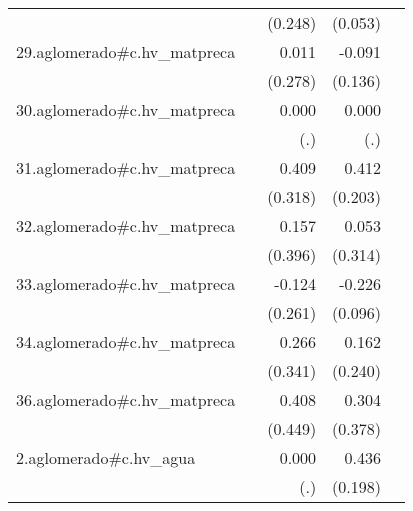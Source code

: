 {\begin{longtable}{l*{4}{D{.}{.}{-1}}}
            &                     &     (0.248)         &     (0.053)         &                     \\
\addlinespace
29.aglomerado#c.hv\_matpreca&                     &       0.011         &      -0.091         &                     \\
            &                     &     (0.278)         &     (0.136)         &                     \\
\addlinespace
30.aglomerado#c.hv\_matpreca&                     &       0.000         &       0.000         &                     \\
            &                     &         (.)         &         (.)         &                     \\
\addlinespace
31.aglomerado#c.hv\_matpreca&                     &       0.409         &       0.412\sym{*}  &                     \\
            &                     &     (0.318)         &     (0.203)         &                     \\
\addlinespace
32.aglomerado#c.hv\_matpreca&                     &       0.157         &       0.053         &                     \\
            &                     &     (0.396)         &     (0.314)         &                     \\
\addlinespace
33.aglomerado#c.hv\_matpreca&                     &      -0.124         &      -0.226\sym{*}  &                     \\
            &                     &     (0.261)         &     (0.096)         &                     \\
\addlinespace
34.aglomerado#c.hv\_matpreca&                     &       0.266         &       0.162         &                     \\
            &                     &     (0.341)         &     (0.240)         &                     \\
\addlinespace
36.aglomerado#c.hv\_matpreca&                     &       0.408         &       0.304         &                     \\
            &                     &     (0.449)         &     (0.378)         &                     \\
\addlinespace
2.aglomerado#c.hv\_agua&                     &       0.000         &       0.436\sym{*}  &                     \\
            &                     &         (.)         &     (0.198)         &                     \\

\end{longtable}}

